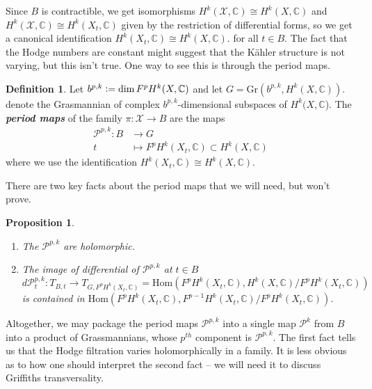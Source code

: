 \documentclass[psamsfonts, 12pt]{amsart}
\newtheorem{prop}[thm]{Proposition}
\theoremstyle{definition}
\newtheorem{defn}[thm]{Definition}
\theoremstyle{remark}
\newcommand{\ib}[1]{\textbf{\textit{#1}}}
\newcommand{\C}{\mathbb{C}}
\newcommand{\defeq}{\vcentcolon=}
\newcommand{\enumbreak}{\ \\ \vspace{-\baselineskip}}
\begin{document}
Since $B$ is contractible, we get isomorphisms $H^k(\mathcal{X},\C) \cong H^k(X,\C)$
and $H^k(\mathcal{X},\C) \cong H^k(X_t,\C)$ given by the restriction of differential
forms, so we get a canonical identification $H^k(X_t,\C) \cong H^k(X,\C)$.
for all $t \in B$. The fact that the Hodge numbers are constant might
suggest that the K\"ahler structure is not varying, but this isn't true.
One way to see this is through the period maps.
%
\begin{defn}
Let $b^{p,k} \defeq \dim F^pH^k(X,\C)$ and let $G = \mathrm{Gr}(b^{p,k}, H^k(X,\C))$.
denote the Grasmannian of complex $b^{p,k}$-dimensional subspaces of $H^k(X,\C$).
The \ib{period maps} of the family $\pi : \mathcal{X} \to B$ are the maps
\begin{align*}
\mathcal{P}^{p,k} : B &\to G \\
t &\mapsto F^pH^k(X_t,\C) \subset H^k(X,\C)
\end{align*}
where  we use the identification
$H^k(X_t,\C) \cong H^k(X,\C)$.
\end{defn}
%
There are two key facts about the period maps that we will need, but
won't prove.
%
\begin{prop} \enumbreak
\begin{enumerate}
  \item The $\mathcal{P}^{p,k}$ are holomorphic.
  \item The image of differential of $\mathcal{P}^{p,k}$ at $t \in B$
  \[
  d\mathcal{P}^{p,k}_t : T_{B,t} \to T_{G,F^pH^k(X_t,\C)}
  = \mathrm{Hom}(F^pH^k(X_t,\C), H^k(X,\C)/F^pH^k(X_t,\C))
  \]
  is contained in $\mathrm{Hom}(F^pH^k(X_t,\C), F^{p-1}H^k(X_t,\C)/F^pH^k(X_t,\C))$.
\end{enumerate}
\end{prop}
%
Altogether, we may package the period maps $\mathcal{P}^{p,k}$ into a
single map $\mathcal{P}^k$ from $B$ into a product of Grassmannians,
whose $p^{th}$ component is $\mathcal{P}^{p,k}$.
%
The first fact tells us that the Hodge filtration varies holomorphically
in a family. It is less obvious as to how one should interpret the second
fact -- we will need it to discuss Griffiths transversality. \\
\end{document}
